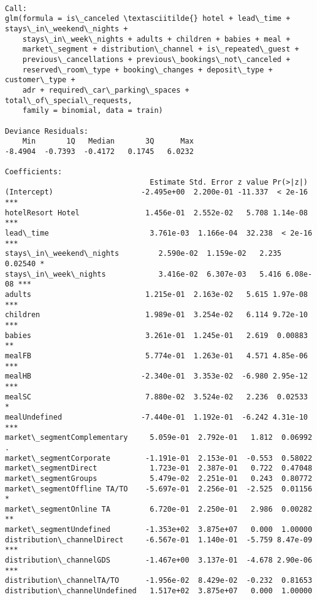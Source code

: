 \documentclass[11pt]{article}
\begin{document}
    
    \begin{Verbatim}[commandchars=\\\{\}]

Call:
glm(formula = is\_canceled \textasciitilde{} hotel + lead\_time + stays\_in\_weekend\_nights + 
    stays\_in\_week\_nights + adults + children + babies + meal + 
    market\_segment + distribution\_channel + is\_repeated\_guest + 
    previous\_cancellations + previous\_bookings\_not\_canceled + 
    reserved\_room\_type + booking\_changes + deposit\_type + customer\_type + 
    adr + required\_car\_parking\_spaces + total\_of\_special\_requests, 
    family = binomial, data = train)

Deviance Residuals: 
    Min       1Q   Median       3Q      Max  
-8.4904  -0.7393  -0.4172   0.1745   6.0232  

Coefficients:
                                 Estimate Std. Error z value Pr(>|z|)    
(Intercept)                    -2.495e+00  2.200e-01 -11.337  < 2e-16 ***
hotelResort Hotel               1.456e-01  2.552e-02   5.708 1.14e-08 ***
lead\_time                       3.761e-03  1.166e-04  32.238  < 2e-16 ***
stays\_in\_weekend\_nights         2.590e-02  1.159e-02   2.235  0.02540 *  
stays\_in\_week\_nights            3.416e-02  6.307e-03   5.416 6.08e-08 ***
adults                          1.215e-01  2.163e-02   5.615 1.97e-08 ***
children                        1.989e-01  3.254e-02   6.114 9.72e-10 ***
babies                          3.261e-01  1.245e-01   2.619  0.00883 ** 
mealFB                          5.774e-01  1.263e-01   4.571 4.85e-06 ***
mealHB                         -2.340e-01  3.353e-02  -6.980 2.95e-12 ***
mealSC                          7.880e-02  3.524e-02   2.236  0.02533 *  
mealUndefined                  -7.440e-01  1.192e-01  -6.242 4.31e-10 ***
market\_segmentComplementary     5.059e-01  2.792e-01   1.812  0.06992 .  
market\_segmentCorporate        -1.191e-01  2.153e-01  -0.553  0.58022    
market\_segmentDirect            1.723e-01  2.387e-01   0.722  0.47048    
market\_segmentGroups            5.479e-02  2.251e-01   0.243  0.80772    
market\_segmentOffline TA/TO    -5.697e-01  2.256e-01  -2.525  0.01156 *  
market\_segmentOnline TA         6.720e-01  2.250e-01   2.986  0.00282 ** 
market\_segmentUndefined        -1.353e+02  3.875e+07   0.000  1.00000    
distribution\_channelDirect     -6.567e-01  1.140e-01  -5.759 8.47e-09 ***
distribution\_channelGDS        -1.467e+00  3.137e-01  -4.678 2.90e-06 ***
distribution\_channelTA/TO      -1.956e-02  8.429e-02  -0.232  0.81653    
distribution\_channelUndefined   1.517e+02  3.875e+07   0.000  1.00000    

\end{Verbatim}
\end{document}
